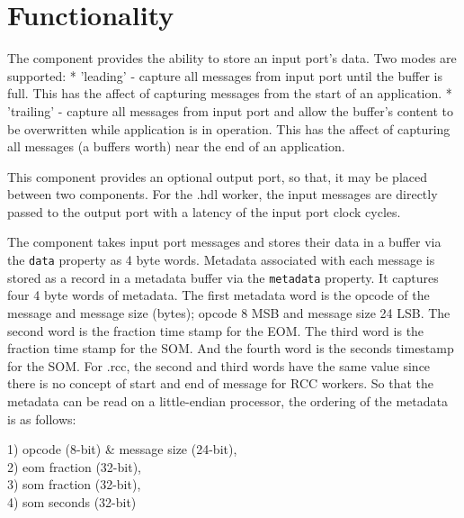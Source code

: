 \def\name{\comp}
\def\workertype{}
\def\version{\ocpiversion}
\def\releasedate{11/2019}
\def\componentlibrary{ocpi.assets.util\_{}comps}
\def\workers{\comp{}.hdl}
\def\testedplatforms{isim, Matchstiq-Z1(PL), xsim, ZedBoard(PL), centos 7}


\section*{Functionality}
\begin{flushleft}

The {\comp} component provides the ability to store an input port's
data. Two modes are supported: \newline
* 'leading' - capture all messages from input port until the buffer is full. This has the affect of capturing messages from the start of an application. \newline
* 'trailing' - capture all messages from input port and allow the buffer's content to be overwritten while application is in operation. This has the affect of capturing all messages (a buffers worth) near the end of an application. \newline

This component provides an optional output port, so that, it may be
placed between two components. For the {\comp}.hdl worker, the input messages are directly passed to
the output port with a latency of the input port clock cycles. \newline

The {\comp} component takes input port messages and stores their data in a buffer via the \texttt{data} property as 4 byte words. Metadata associated with each message is stored as a record in a metadata buffer via the \texttt{metadata} property. It captures four 4 byte words of metadata. The first metadata word is the opcode of the message and message size (bytes); opcode 8 MSB and message size 24 LSB. The second word is the fraction time stamp for the EOM. The third word is the fraction time stamp for the SOM. And the fourth word is the seconds timestamp for the SOM. For {\comp}.rcc, the second and third words have the same value since there is no concept of start and end of message for RCC workers. So that the metadata can be read on a little-endian processor, the ordering of the metadata is as follows: \newline

1) opcode (8-bit) \& message size (24-bit), \\
2) eom fraction (32-bit), \\
3) som fraction (32-bit), \\
4) som seconds (32-bit) \newline


\end{flushleft}
